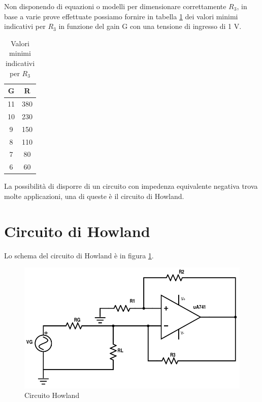 \documentclass[journal, a4paper]{IEEEtran}
\begin{document}
Non disponendo di equazioni o modelli per dimensionare correttamente $R_3$, in base a varie prove effettuate possiamo fornire in tabella \ref{tab:r3} dei valori minimi indicativi per $R_3$ in funzione del gain G con una tensione di ingresso di 1 V.

\begin {table}[htp]
\caption {Valori minimi indicativi per $R_3$} 
\label{tab:r3} 
\begin{center}
\begin{tabular}{|c|c|}
\hline 
G & R \\ 
\hline 
11 & 380 \\ 
\hline 
10 & 230 \\ 
\hline 
9 & 150 \\ 
\hline 
8 & 110 \\ 
\hline 
7 & 80 \\ 
\hline 
6 & 60 \\ 
\hline 
\end{tabular} 
\end{center}
\end {table}

La possibilità di disporre di un circuito con impedenza equivalente negativa trova molte applicazioni, una di queste è il circuito di Howland.

\section{Circuito di Howland}

Lo schema del circuito di Howland è in figura \ref{fig:how}.

\begin{figure}[htp]
\centering
\includegraphics[scale=.3]{howland}
\caption{Circuito Howland}
\label{fig:how}
\end{figure}
\end{document}
